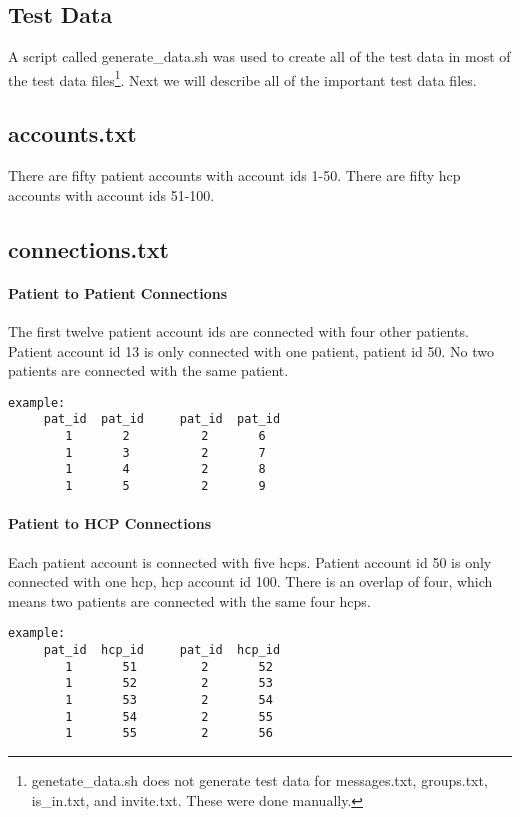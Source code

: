 \subsection{Test Data} A script called generate\_data.sh was used to create all of the test data in most of the test data files\footnote{genetate\_data.sh does not generate test data for messages.txt, groups.txt, is\_in.txt, and invite.txt.  These were done manually.}.  Next we will describe all of the important test data files.

\subsection{accounts.txt} There are fifty patient accounts with account ids 1-50.  There are fifty hcp accounts with account ids 51-100.

\subsection{connections.txt} 
\paragraph{Patient to Patient Connections}The first twelve patient account ids are connected with four other patients.  Patient account id 13 is only connected with one patient, patient id 50.  No two patients are connected with the same patient.
\begin{verbatim}
example:
     pat_id  pat_id     pat_id  pat_id		
        1       2          2       6			
        1       3          2       7
        1       4          2       8
        1       5          2       9		
\end{verbatim}

\paragraph{Patient to HCP Connections} Each patient account is connected with five hcps.  Patient account id 50 is only connected with one hcp, hcp account id 100.  There is an overlap of four, which means two patients are connected with the same four hcps.
\begin{verbatim}
example:
     pat_id  hcp_id     pat_id  hcp_id		
        1       51         2       52
        1       52         2       53
        1       53         2       54
        1       54         2       55
        1       55         2       56
\end{verbatim}


